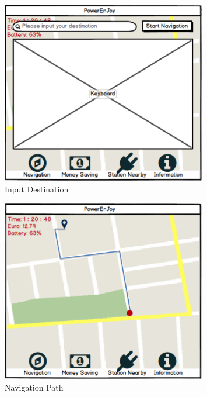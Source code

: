 \documentclass[a4paper,11pt]{article}
\begin{document}
	\begin{figure}[H]
   			\centering
   			\includegraphics[width=0.8\textwidth]{images/navigation}
  	    		\caption{Input Destination}\label{fig-navigation}
	\end{figure}
	
	\begin{figure}[H]
   			\centering
   			\includegraphics[width=0.8\textwidth]{images/path}
  	    		\caption{Navigation Path}\label{fig-path}
	\end{figure}
	
\end{document}
